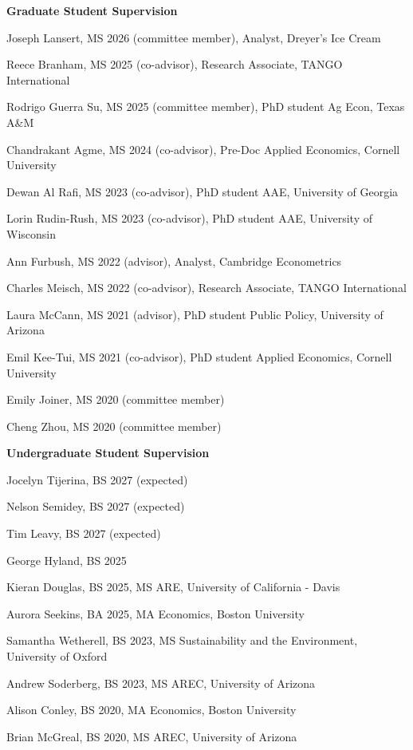\documentclass[letterpaper]{article}
\renewenvironment{itemize}{
  \begin{list}
  	{}{
    \setlength{\leftmargin}{1.5em}
    \setlength{\itemsep}{-.5em}
  }
}{
  \end{list}
}
\begin{document}
\begin{itemize}
	\item {\bf Graduate Student Supervision}
	\begin{itemize}
        \item Joseph Lansert, MS 2026 (committee member), Analyst, Dreyer's Ice Cream
		\item Reece Branham, MS 2025 (co-advisor), Research Associate, TANGO International
        \item Rodrigo Guerra Su, MS 2025 (committee member), PhD student Ag Econ, Texas A\&M
		\item Chandrakant Agme, MS 2024 (co-advisor), Pre-Doc Applied Economics, Cornell University 
		\item Dewan Al Rafi, MS 2023 (co-advisor), PhD student AAE, University of Georgia
		\item Lorin Rudin-Rush, MS 2023 (co-advisor), PhD student AAE, University of Wisconsin
		\item Ann Furbush, MS 2022 (advisor), Analyst, Cambridge Econometrics
		\item Charles Meisch, MS 2022 (co-advisor), Research Associate, TANGO International
		\item Laura McCann, MS 2021 (advisor), PhD student Public Policy, University of Arizona
		\item Emil Kee-Tui, MS 2021 (co-advisor), PhD student Applied Economics, Cornell University
		\item Emily Joiner, MS 2020 (committee member)
		\item Cheng Zhou, MS 2020 (committee member) \\
	\end{itemize}

	\leftskip 0in
	\item {\bf Undergraduate Student Supervision}
	\begin{itemize}
        \item Jocelyn Tijerina, BS 2027 (expected)
        \item Nelson Semidey, BS 2027 (expected)
        \item Tim Leavy, BS 2027 (expected)
        \item George Hyland, BS 2025
        \item Kieran Douglas, BS 2025, MS ARE, University of California - Davis
        \item Aurora Seekins, BA 2025, MA Economics, Boston University
		\item Samantha Wetherell, BS 2023, MS Sustainability and the Environment, University of Oxford
		\item Andrew Soderberg, BS 2023, MS AREC, University of Arizona
		\item Alison Conley, BS 2020, MA Economics, Boston University
		\item Brian McGreal, BS 2020, MS AREC, University of Arizona \\
	\end{itemize}


\end{itemize}
\end{document}
